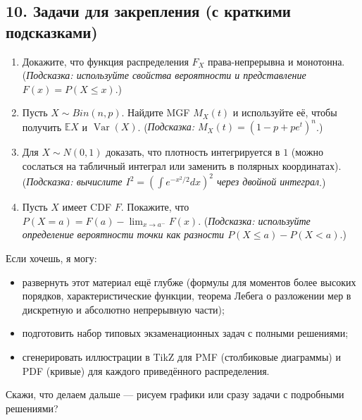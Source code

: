 \subsection*{10. Задачи для закрепления (с краткими подсказками)}

\begin{enumerate}
  \item Докажите, что функция распределения $F_X$ права-непрерывна и монотонна. (\emph{Подсказка: используйте свойства вероятности и представление $F(x)=P(X\le x)$}.)
  \item Пусть $X\sim Bin(n,p)$. Найдите MGF $M_X(t)$ и используйте её, чтобы получить $\mathbb{E}X$ и $\operatorname{Var}(X)$. (\emph{Подсказка: $M_X(t)=(1-p+pe^t)^n$}.)
  \item Для $X\sim N(0,1)$ доказать, что плотность интегрируется в $1$ (можно сослаться на табличный интеграл или заменить в полярных координатах). (\emph{Подсказка: вычислите $I^2=\left(\int e^{-x^2/2}dx\right)^2$ через двойной интеграл}.)
  \item Пусть $X$ имеет CDF $F$. Покажите, что $P(X=a)=F(a)-\lim_{x\to a^-}F(x)$. (\emph{Подсказка: используйте определение вероятности точки как разности $P(X\le a)-P(X<a)$}.)
\end{enumerate}

\bigskip
Если хочешь, я могу:
\begin{itemize}
  \item развернуть этот материал ещё глубже (формулы для моментов более высоких порядков, характеристические функции, теорема Лебега о разложении мер в дискретную и абсолютно непрерывную части);
  \item подготовить набор типовых экзаменационных задач с полными решениями;
  \item сгенерировать иллюстрации в TikZ для PMF (столбиковые диаграммы) и PDF (кривые) для каждого приведённого распределения.
\end{itemize}
Скажи, что делаем дальше — рисуем графики или сразу задачи с подробными решениями?
